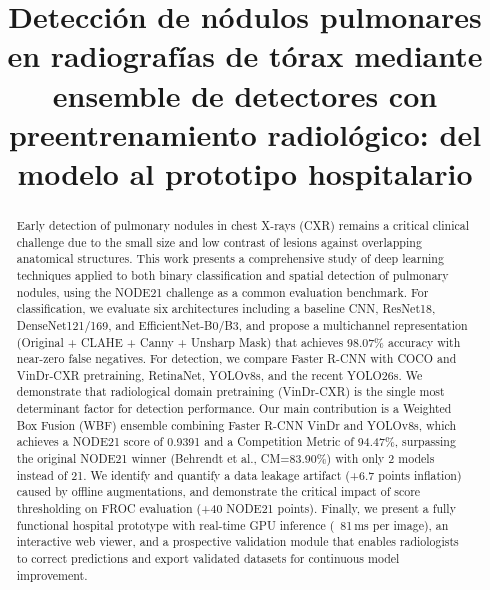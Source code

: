 \documentclass[conference]{IEEEtran}
\begin{document}

\title{\LARGE Detecci\'{o}n de n\'{o}dulos pulmonares en radiograf\'{i}as de t\'{o}rax mediante ensemble de detectores con preentrenamiento radiol\'{o}gico: del modelo al prototipo hospitalario}

\author{
}

\maketitle

\begin{abstract}
Early detection of pulmonary nodules in chest X-rays (CXR) remains a critical
clinical challenge due to the small size and low contrast of lesions against
overlapping anatomical structures. This work presents a comprehensive study of
deep learning techniques applied to both binary classification and spatial
detection of pulmonary nodules, using the NODE21 challenge as a common
evaluation benchmark. For classification, we evaluate six architectures
including a baseline CNN, ResNet18, DenseNet121/169, and EfficientNet-B0/B3,
and propose a multichannel representation (Original + CLAHE + Canny + Unsharp
Mask) that achieves 98.07\% accuracy with near-zero false negatives. For
detection, we compare Faster R-CNN with COCO and VinDr-CXR pretraining,
RetinaNet, YOLOv8s, and the recent YOLO26s. We demonstrate that radiological
domain pretraining (VinDr-CXR) is the single most determinant factor for
detection performance. Our main contribution is a Weighted Box Fusion (WBF)
ensemble combining Faster R-CNN VinDr and YOLOv8s, which achieves a NODE21
score of 0.9391 and a Competition Metric of 94.47\%, surpassing the original
NODE21 winner (Behrendt et al., CM=83.90\%) with only 2 models instead of 21.
We identify and quantify a data leakage artifact (+6.7 points inflation) caused
by offline augmentations, and demonstrate the critical impact of score
thresholding on FROC evaluation (+40 NODE21 points). Finally, we present a
fully functional hospital prototype with real-time GPU inference (~81\,ms per
image), an interactive web viewer, and a prospective validation module that
enables radiologists to correct predictions and export validated datasets for
continuous model improvement.
\end{abstract}
\end{document}
